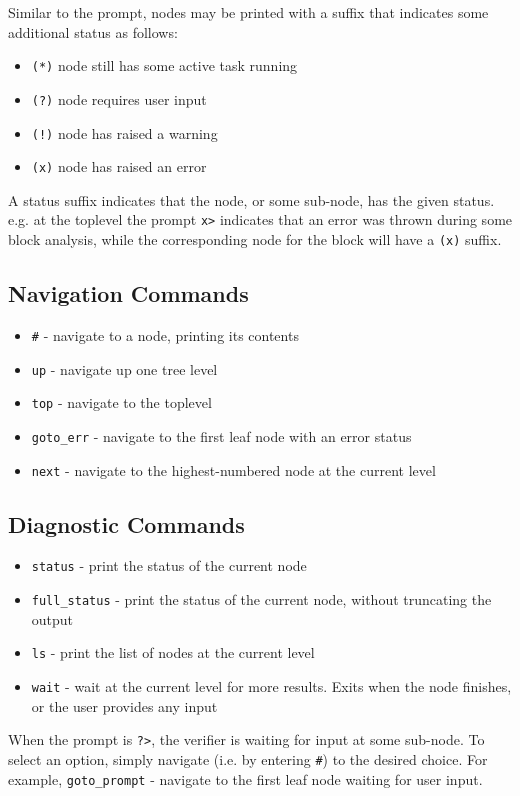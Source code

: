 Similar to the prompt, nodes may be printed with a suffix that indicates some additional status as follows:
\begin{itemize}
\item \texttt{(*)} node still has some active task running
\item \texttt{(?)} node requires user input
\item \texttt{(!)} node has raised a warning
\item \texttt{(x)} node has raised an error
\end{itemize}
A status suffix indicates that the node, or some sub-node, has the given status.
e.g. at the toplevel the prompt \texttt{x>} indicates that an error was thrown during some block analysis, while the corresponding node for the block will have a \texttt{(x)} suffix.

\subsection{Navigation Commands}

\begin{itemize}
\item \texttt{\#} - navigate to a node, printing its contents
\item \texttt{up} - navigate up one tree level
\item \texttt{top} - navigate to the toplevel
\item \texttt{goto\_err} - navigate to the first leaf node with an error status
\item \texttt{next} - navigate to the highest-numbered node at the current level
\end{itemize}

\subsection{Diagnostic Commands}

\begin{itemize}
\item \texttt{status} - print the status of the current node
\item \texttt{full\_status} - print the status of the current node, without truncating the output
\item \texttt{ls} - print the list of nodes at the current level
\item \texttt{wait} - wait at the current level for more results. Exits when the node finishes, or
the user provides any input
\end{itemize}
When the prompt is \texttt{?>}, the verifier is waiting for input at some sub-node.
To select an option, simply navigate (i.e. by entering \texttt{\#}) to the desired choice.
For example, \texttt{goto\_prompt} - navigate to the first leaf node waiting for user input.


